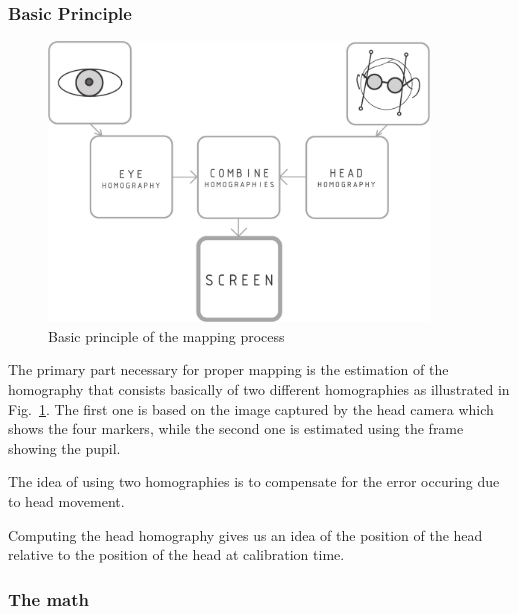 \subsubsection{Basic Principle}
\begin{figure}[H]
  \centering
  \includegraphics[width=0.9\textwidth]{../finalpres/01c.pdf}
  \caption{Basic principle of the mapping process}\label{fig:basic}
\end{figure}
The primary part necessary for proper mapping is the estimation of the homography that consists basically of two different homographies as illustrated in Fig.~\ref{fig:basic}. 
The first one is based on the image captured by the head camera which shows the four markers, while the second one is estimated using the frame showing the pupil.

The idea of using two homographies is to compensate for the error occuring due to head movement.

Computing the head homography gives us an idea of the position of the head relative to the position of the head at calibration time. 



\subsubsection{The math}

